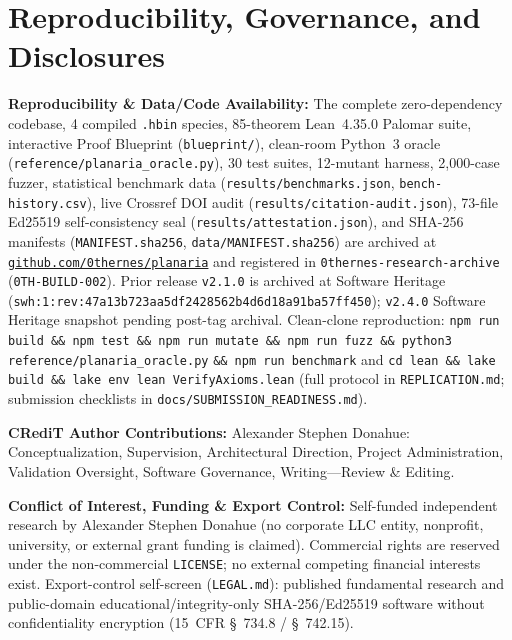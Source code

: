 \documentclass[11pt,letterpaper]{article}
\theoremstyle{remark}
\begin{document}
\section{Reproducibility, Governance, and Disclosures}
\label{sec:disclosures}

\noindent\textbf{Reproducibility \& Data/Code Availability:} The complete zero-dependency codebase, 4 compiled \texttt{.hbin} species, 85-theorem Lean~4.35.0 Palomar suite, interactive Proof Blueprint (\texttt{blueprint/}), clean-room Python~3 oracle (\nolinkurl{reference/planaria_oracle.py}), 30 test suites, 12-mutant harness, 2,000-case fuzzer, statistical benchmark data (\nolinkurl{results/benchmarks.json}, \nolinkurl{bench-history.csv}), live Crossref DOI audit (\nolinkurl{results/citation-audit.json}), 73-file Ed25519 self-consistency seal \cite{bernstein2012} (\nolinkurl{results/attestation.json}), and SHA-256 manifests (\texttt{MANIFEST.\allowbreak sha256}, \nolinkurl{data/MANIFEST.sha256}) are archived at \href{https://github.com/0thernes/planaria}{\nolinkurl{github.com/0thernes/planaria}} and registered in \nolinkurl{0thernes-research-archive} (\texttt{0TH-BUILD-002}). Prior release \texttt{v2.1.0} is archived at Software Heritage (\nolinkurl{swh:1:rev:47a13b723aa5df2428562b4d6d18a91ba57ff450}); \texttt{v2.4.0} Software Heritage snapshot pending post-tag archival. Clean-clone reproduction: \texttt{npm run build \&\& npm test \&\& npm run mutate \&\& npm run fuzz \&\& python3} \nolinkurl{reference/planaria_oracle.py} \texttt{\&\& npm run benchmark} and \texttt{cd lean \&\& lake build \&\& lake env lean VerifyAxioms.\allowbreak lean} (full protocol in \texttt{REPLICATION.md}; submission checklists in \nolinkurl{docs/SUBMISSION_READINESS.md}).

\smallskip\noindent\textbf{CRediT Author Contributions:} Alexander Stephen Donahue: Conceptualization, Supervision, Architectural Direction, Project Administration, Validation Oversight, Software Governance, Writing---Review \& Editing.

\smallskip\noindent\textbf{Conflict of Interest, Funding \& Export Control:} Self-funded independent research by Alexander Stephen Donahue (no corporate LLC entity, nonprofit, university, or external grant funding is claimed). Commercial rights are reserved under the non-commercial \texttt{LICENSE}; no external competing financial interests exist. Export-control self-screen (\texttt{LEGAL.md}): published fundamental research and public-domain educational/integrity-only SHA-256/Ed25519 software without confidentiality encryption (15~CFR \S~734.8 / \S~742.15).
\end{document}
